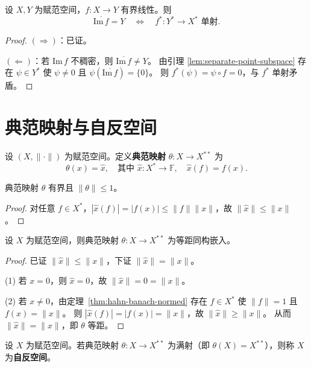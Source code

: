 \documentclass[lang=cn,a4paper,newtx,section]{elegantbook}
\begin{document}
\begin{theorem}
  设 $X,Y$ 为赋范空间，$f:X\to Y$ 有界线性。则
  \[
    \overline{\mathrm{Im}\,f}=Y\quad\Longleftrightarrow\quad f^*:Y^*\to X^*\text{ 单射}.
  \]
\end{theorem}

\begin{proof}
  $(\Rightarrow)$：已证。

  $(\Leftarrow)$：若 $\mathrm{Im}\,f$ 不稠密，则 $\overline{\mathrm{Im}\,f}\ne Y$。
  由引理 \ref{lem:separate-point-subspace} 存在 $\psi\in Y^*$ 使 $\psi\ne 0$ 且 $\psi(\overline{\mathrm{Im}\,f})=\{0\}$。
  则 $f^*(\psi)=\psi\circ f=0$，与 $f^*$ 单射矛盾。
\end{proof}

\section{典范映射与自反空间}

\begin{definition}[典范映射]
  设 $(X,\|\cdot\|)$ 为赋范空间。定义\textbf{典范映射} $\theta:X\to X^{**}$ 为
  \[
    \theta(x)=\hat{x},\quad\text{其中 }\hat{x}:X^*\to\mathbb{F},\quad\hat{x}(f)=f(x).
  \]
\end{definition}

\begin{proposition}
  典范映射 $\theta$ 有界且 $\|\theta\|\le 1$。
\end{proposition}

\begin{proof}
  对任意 $f\in X^*$，$|\hat{x}(f)|=|f(x)|\le\|f\|\|x\|$，故 $\|\hat{x}\|\le\|x\|$。
\end{proof}

\begin{theorem}
  设 $X$ 为赋范空间，则典范映射 $\theta:X\to X^{**}$ 为等距同构嵌入。
\end{theorem}

\begin{proof}
  已证 $\|\hat{x}\|\le\|x\|$，下证 $\|\hat{x}\|=\|x\|$。

  (1) 若 $x=0$，则 $\hat{x}=0$，故 $\|\hat{x}\|=0=\|x\|$。

  (2) 若 $x\ne 0$，由定理~\ref{thm:hahn-banach-normed} 存在 $f\in X^*$ 使 $\|f\|=1$ 且 $f(x)=\|x\|$。
  则 $|\hat{x}(f)|=|f(x)|=\|x\|$，故 $\|\hat{x}\|\ge\|x\|$。
  从而 $\|\hat{x}\|=\|x\|$，即 $\theta$ 等距。
\end{proof}

\begin{definition}[自反空间]
  设 $X$ 为赋范空间。若典范映射 $\theta:X\to X^{**}$ 为满射（即 $\theta(X)=X^{**}$），则称 $X$ 为\textbf{自反空间}。
\end{definition}
\end{document}
